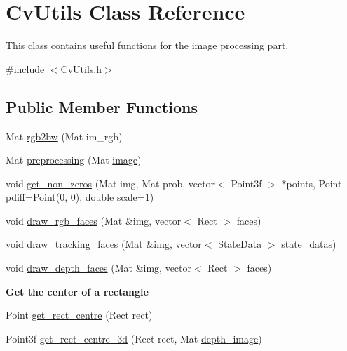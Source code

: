 \hypertarget{classCvUtils}{
\section{CvUtils Class Reference}
\label{classCvUtils}
}


This class contains useful functions for the image processing part.  




{\ttfamily \#include $<$CvUtils.h$>$}

\subsection*{Public Member Functions}
\begin{DoxyCompactItemize}
\item 
Mat \hyperlink{classCvUtils_aa5bded11699d39af25c420aed2ade0ba}{rgb2bw} (Mat im\_\-rgb)
\item 
Mat \hyperlink{classCvUtils_a47189479acb67a1918f35557fc5906a6}{preprocessing} (Mat \hyperlink{createGT_8cpp_aabb27b8973575043030df51be47cd24a}{image})
\item 
void \hyperlink{classCvUtils_a426439fc003e5557644932eee66c48b6}{get\_\-non\_\-zeros} (Mat img, Mat prob, vector$<$ Point3f $>$ $\ast$points, Point pdiff=Point(0, 0), double scale=1)
\item 
void \hyperlink{classCvUtils_a74249b2e9b76b2a8ae2c01c4ff496663}{draw\_\-rgb\_\-faces} (Mat \&img, vector$<$ Rect $>$ faces)
\item 
void \hyperlink{classCvUtils_ac86c2ad8adca706655831938b63ebaa2}{draw\_\-tracking\_\-faces} (Mat \&img, vector$<$ \hyperlink{classStateData}{StateData} $>$ \hyperlink{social__robot_8cpp_a63ba5e41659a1483954bc6564bca605a}{state\_\-datas})
\item 
void \hyperlink{classCvUtils_a6e1f3369c2b553c06f2692c75e20667d}{draw\_\-depth\_\-faces} (Mat \&img, vector$<$ Rect $>$ faces)
\end{DoxyCompactItemize}
\begin{Indent}{\bf Get the center of a rectangle}\par
{\em \label{_amgrpba9070ac2a0557f402adf1649807a39b}
 }\begin{DoxyCompactItemize}
\item 
Point \hyperlink{classCvUtils_aa54494728db8503a7311ff2f9ad8ab1c}{get\_\-rect\_\-centre} (Rect rect)
\item 
Point3f \hyperlink{classCvUtils_a9a91a1dbd7a74ef15257510129308277}{get\_\-rect\_\-centre\_\-3d} (Rect rect, Mat \hyperlink{social__robot__onethread_8cpp_a5b613972ff73fd7b34e0ee18acc5c1a6}{depth\_\-image})
\end{DoxyCompactItemize}
\end{Indent}
